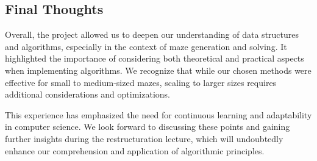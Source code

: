\documentclass{article}
\begin{document}
\subsection*{Final Thoughts}

Overall, the project allowed us to deepen our understanding of data structures and algorithms, especially in the context of maze generation and solving. It highlighted the importance of considering both theoretical and practical aspects when implementing algorithms. We recognize that while our chosen methods were effective for small to medium-sized mazes, scaling to larger sizes requires additional considerations and optimizations.

This experience has emphasized the need for continuous learning and adaptability in computer science. We look forward to discussing these points and gaining further insights during the restructuration lecture, which will undoubtedly enhance our comprehension and application of algorithmic principles.
\end{document}
